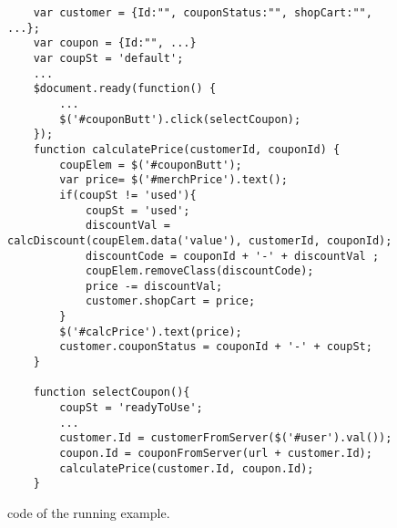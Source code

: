 \begin{figure}
\begin{lstlisting}
	var customer = {Id:"", couponStatus:"", shopCart:"", ...};
	var coupon = {Id:"", ...}
	var coupSt = 'default';
	...
	$document.ready(function() {
		...
		$('#couponButt').click(selectCoupon);
	});
	function calculatePrice(customerId, couponId) {
		coupElem = $('#couponButt');
		var price= $('#merchPrice').text();
		if(coupSt != 'used'){
			coupSt = 'used';
			discountVal = calcDiscount(coupElem.data('value'), customerId, couponId);
			discountCode = couponId + '-' + discountVal ;
			coupElem.removeClass(discountCode); 
			price -= discountVal;
			customer.shopCart = price;	
		}
		$('#calcPrice').text(price);
		customer.couponStatus = couponId + '-' + coupSt;  
	}
	
	function selectCoupon(){
		coupSt = 'readyToUse';
		...
		customer.Id = customerFromServer($('#user').val());
		coupon.Id = couponFromServer(url + customer.Id);
		calculatePrice(customer.Id, coupon.Id);
	}

\end{lstlisting}
\vspace{-0.1in} 

\caption{\javascript code of the running example.}
\label{Fig:example}
\vspace{-0.2in} 

\end{figure}